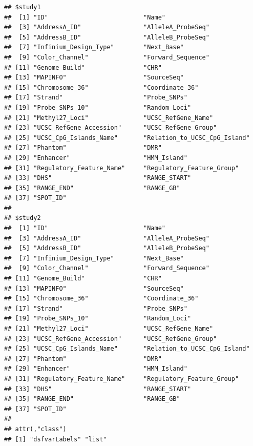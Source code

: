 \documentclass[
]{book}
\begin{document}
\begin{verbatim}
## $study1
##  [1] "ID"                          "Name"                       
##  [3] "AddressA_ID"                 "AlleleA_ProbeSeq"           
##  [5] "AddressB_ID"                 "AlleleB_ProbeSeq"           
##  [7] "Infinium_Design_Type"        "Next_Base"                  
##  [9] "Color_Channel"               "Forward_Sequence"           
## [11] "Genome_Build"                "CHR"                        
## [13] "MAPINFO"                     "SourceSeq"                  
## [15] "Chromosome_36"               "Coordinate_36"              
## [17] "Strand"                      "Probe_SNPs"                 
## [19] "Probe_SNPs_10"               "Random_Loci"                
## [21] "Methyl27_Loci"               "UCSC_RefGene_Name"          
## [23] "UCSC_RefGene_Accession"      "UCSC_RefGene_Group"         
## [25] "UCSC_CpG_Islands_Name"       "Relation_to_UCSC_CpG_Island"
## [27] "Phantom"                     "DMR"                        
## [29] "Enhancer"                    "HMM_Island"                 
## [31] "Regulatory_Feature_Name"     "Regulatory_Feature_Group"   
## [33] "DHS"                         "RANGE_START"                
## [35] "RANGE_END"                   "RANGE_GB"                   
## [37] "SPOT_ID"                    
## 
## $study2
##  [1] "ID"                          "Name"                       
##  [3] "AddressA_ID"                 "AlleleA_ProbeSeq"           
##  [5] "AddressB_ID"                 "AlleleB_ProbeSeq"           
##  [7] "Infinium_Design_Type"        "Next_Base"                  
##  [9] "Color_Channel"               "Forward_Sequence"           
## [11] "Genome_Build"                "CHR"                        
## [13] "MAPINFO"                     "SourceSeq"                  
## [15] "Chromosome_36"               "Coordinate_36"              
## [17] "Strand"                      "Probe_SNPs"                 
## [19] "Probe_SNPs_10"               "Random_Loci"                
## [21] "Methyl27_Loci"               "UCSC_RefGene_Name"          
## [23] "UCSC_RefGene_Accession"      "UCSC_RefGene_Group"         
## [25] "UCSC_CpG_Islands_Name"       "Relation_to_UCSC_CpG_Island"
## [27] "Phantom"                     "DMR"                        
## [29] "Enhancer"                    "HMM_Island"                 
## [31] "Regulatory_Feature_Name"     "Regulatory_Feature_Group"   
## [33] "DHS"                         "RANGE_START"                
## [35] "RANGE_END"                   "RANGE_GB"                   
## [37] "SPOT_ID"                    
## 
## attr(,"class")
## [1] "dsfvarLabels" "list"
\end{verbatim}
\end{document}
